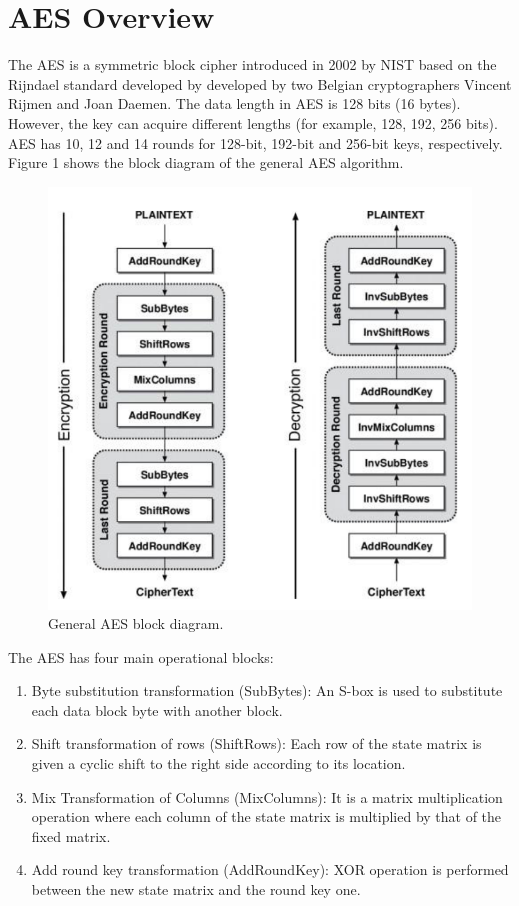 \section{AES Overview}
The AES is a symmetric block cipher introduced in 2002 by NIST based on the Rijndael standard developed by developed by two Belgian cryptographers Vincent Rijmen and Joan Daemen. The data length in AES is 128 bits (16 bytes). However, the key can acquire different lengths (for example, 128, 192, 256 bits). AES has 10, 12 and 14 rounds for 128-bit, 192-bit and 256-bit keys, respectively. Figure 1 shows the block diagram of the general AES algorithm.

\begin{figure}[h]
\centering
\includegraphics[scale=.4]{tex/Projects/CamdenLandis/aes-block-diagram.png}
\caption{General AES block diagram.}
\end{figure}

The AES has four main operational blocks:
\begin{enumerate}
    \item Byte substitution transformation (SubBytes): An S-box is used to substitute each data block byte with another block.

    \item Shift transformation of rows (ShiftRows): Each row of the state matrix is given a cyclic shift to the right side according to its location.

    \item Mix Transformation of Columns (MixColumns): It is a matrix multiplication operation where each column of the state matrix is multiplied by that of the fixed matrix.

    \item Add round key transformation (AddRoundKey): XOR operation is performed between the new state matrix and the round key one.
\end{enumerate}


